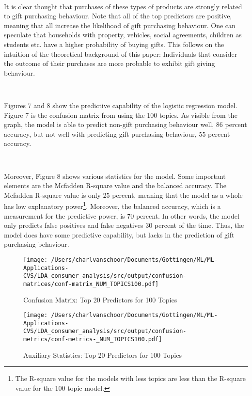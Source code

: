 \

It is clear thought that purchases of these types of products are strongly related to gift purchasing behaviour. Note that all of the top predictors are positive, meaning that all increase the likelihood of gift purchasing behaviour. One can speculate that households with property, vehicles, social agreements, children as students etc. have a higher probability of buying gifts. This follows on the intuition of the theoretical background of this paper: Individuals that consider the outcome of their purchases are more probable to exhibit gift giving behaviour. 

\

Figures 7 and 8 show the predictive capability of the logistic regression model. Figure 7 is the confusion matrix from using the 100 topics. As visible from the graph, the model is able to predict non-gift purchasing behaviour well, 86 percent accuracy, but not well with predicting gift purchasing behaviour, 55 percent accuracy. 

\

Moreover, Figure 8 shows various statistics for the model. Some important elements are the Mcfadden R-square value and the balanced accuracy. The Mcfadden R-square value is only 25 percent, meaning that the model as a whole has low explanatory power\footnote{The R-square value for the models with less topics are less than the R-square value for the 100 topic model.}. Moreover, the balanced accuracy, which is a measurement for the predictive power, is 70 percent. In other words, the model only predicts false positives and false negatives 30 percent of the time. Thus, the model does have some predictive capability, but lacks in the prediction of gift purchasing behaviour. 


\begin{figure}[!h]
\caption{Confusion Matrix: Top 20 Predictors for 100 Topics}\centering
\texttt{[image: /Users/charlvanschoor/Documents/Gottingen/ML/ML-Applications-CVS/LDA\_consumer\_analysis/src/output/confusion-matrices/conf-matrix\_NUM\_TOPICS100.pdf]}
\end{figure}

\begin{figure}[!h]
\caption{Auxiliary Statistics: Top 20 Predictors for 100 Topics}\centering
\texttt{[image: /Users/charlvanschoor/Documents/Gottingen/ML/ML-Applications-CVS/LDA\_consumer\_analysis/src/output/confusion-metrics/conf-metrics-\_NUM\_TOPICS100.pdf]}
\end{figure}




